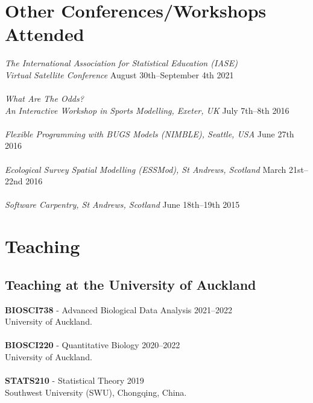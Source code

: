 \documentclass[10pt,letter]{article}
\begin{document}
  
\section*{Other Conferences/Workshops Attended}
\vspace{1mm}
{\sl The International Association for Statistical Education (IASE) \\ Virtual Satellite Conference} \hfill August 30th--September 4th 2021\\
\hdashrule[0.5ex]{4cm}{1pt}{1pt}\\
{\sl What Are The Odds? \\ An Interactive Workshop in Sports Modelling, Exeter, UK} \hfill July 7th--8th 2016\\
\hdashrule[0.5ex]{4cm}{1pt}{1pt}\\
{\sl Flexible Programming with BUGS Models (NIMBLE), Seattle, USA} \hfill June 27th 2016\\
\hdashrule[0.5ex]{4cm}{1pt}{1pt}\\
{\sl Ecological Survey Spatial Modelling (ESSMod), St Andrews, Scotland} \hfill March 21st--22nd 2016\\
 \hdashrule[0.5ex]{4cm}{1pt}{1pt}\\
 {\sl Software Carpentry, St Andrews, Scotland} \hfill June 18th--19th 2015\\
 \newpage
 \section*{Teaching}
\vspace{1mm}
 \subsection*{Teaching at the University of Auckland}
 \vspace{1mm}
 \textbf{BIOSCI738} - Advanced Biological Data Analysis \hfill{2021--2022} \\
 University of Auckland.\\
\hdashrule[0.5ex]{4cm}{1pt}{1pt}\\
 \textbf{BIOSCI220} - Quantitative Biology \hfill{2020--2022} \\
 University of Auckland.\\
\hdashrule[0.5ex]{4cm}{1pt}{1pt}\\
 \textbf{STATS210} - Statistical Theory \hfill{2019} \\
 Southwest University (SWU), Chongqing, China.
\end{document}
